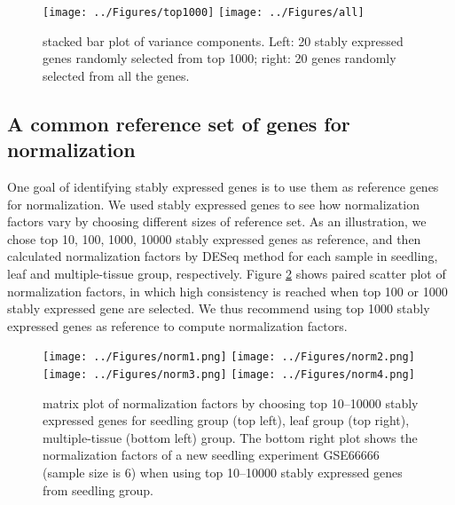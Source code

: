 \documentclass[11pt, a4paper]{article}
\begin{document}
\begin{figure}[!h]
	\centering
	\texttt{[image: ../Figures/top1000]}
	\texttt{[image: ../Figures/all]}
	\caption{stacked bar plot of variance components. Left: 20 stably expressed genes randomly selected from top 1000; right: 20 genes randomly selected from all the genes.}
	\label{fig:all}
\end{figure}




\subsection{A common reference set of genes for normalization}\label{Section:commonReference}
One goal of identifying stably expressed genes is to use them as reference genes for normalization. We used stably expressed genes to see how normalization factors vary by choosing different sizes of reference set.   As an illustration, we chose top 10, 100, 1000, 10000 stably expressed genes as reference, and then calculated normalization factors by DESeq method for each sample in seedling, leaf and multiple-tissue group, respectively. Figure \ref{fig:normfactor} shows paired scatter plot of normalization factors, in which high consistency is reached when top 100 or 1000 stably expressed gene are selected. We thus recommend using top 1000 stably expressed genes as reference to compute normalization factors. %



 \begin{figure}[h!]
\begin{center}
\texttt{[image: ../Figures/norm1.png]}
\texttt{[image: ../Figures/norm2.png]}
\texttt{[image: ../Figures/norm3.png]}
\texttt{[image: ../Figures/norm4.png]}
\caption{\label{fig:normfactor} matrix plot of normalization factors by choosing top 10--10000 stably expressed genes for seedling group (top left), leaf group (top right), multiple-tissue (bottom left) group. The bottom right plot shows the normalization factors of a new seedling experiment GSE66666 (sample size is 6) when using top 10--10000 stably expressed genes from seedling group.}
\end{center}
\end{figure}
\end{document}
